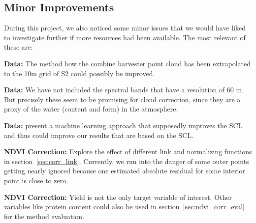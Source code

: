 {    \subsection{Minor Improvements}
        During this project, we also noticed some minor issues that we would have liked to investigate further if more resources had been available. The most relevant of these are:
        \begin{Nitemize}
            \item \textbf{Data:}
            The method how the combine harvester point cloud has been extrapolated to the 10m grid of S2 could possibly be improved.
            \item \textbf{Data:}
            We have not included the spectral bands that have a resolution of 60 m. But precisely these seem to be promising for cloud correction, since they are a proxy of the water (content and form) in the atmosphere.
            \item \textbf{Data:}
            \cite{raiyaniSentinel2ImageScene2021} present a machine learning approach that supposedly improves the SCL and thus could improve our results that are based on the SCL.
            \item \textbf{NDVI Correction:}
            Explore the effect of different link and normalizing functions %
            in section~\ref{sec:corr_link}. Currently, we run into the danger of some outer points getting nearly ignored because one estimated absolute residual for some interior point is close to zero.
            \item \textbf{NDVI Correction:}
            Yield is not the only target variable of interest. Other variables like protein content could also be used in section~\ref{sec:ndvi_corr_eval} for the method evaluation. 
        \end{Nitemize}
}


